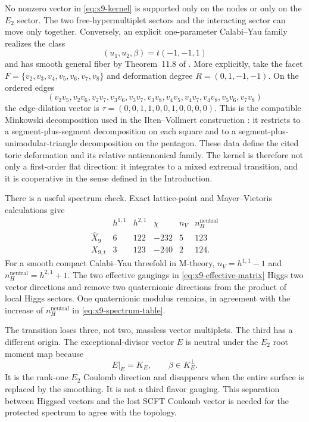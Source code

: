 No nonzero vector in \eqref{eq:x9-kernel} is supported only on the nodes or
only on the $E_2$ sector. The two free-hypermultiplet sectors and the
interacting sector can move only together. Conversely, an explicit
one-parameter Calabi--Yau family realizes the class
\begin{equation}
 (u_1,u_2,\beta)=t(-1,-1,1)
 \label{eq:x9-family-direction}
\end{equation}
and has smooth general fiber by Theorem~11.8 of
\cite{Wuebben:2026smoothing}. More explicitly, take the facet
$F=\{v_2,v_3,v_4,v_5,v_6,v_7,v_8\}$ and deformation degree
$R=(0,1,-1,-1)$. On the ordered edges
\begin{equation}
 (v_2v_5,v_2v_6,v_2v_7,v_3v_6,v_3v_7,v_3v_8,
 v_4v_5,v_4v_7,v_4v_8,v_5v_6,v_7v_8)
 \label{eq:x9-facet-edges}
\end{equation}
the edge-dilation vector is
$\tau=(0,0,1,1,0,0,1,0,0,0,0)$. This is the compatible Minkowski
decomposition used in the Ilten--Vollmert construction
\cite{Altmann:1995,Ilten:2012}: it restricts to a
segment-plus-segment decomposition on each square and to a
segment-plus-unimodular-triangle decomposition on the pentagon. These data
define the cited toric deformation and its relative anticanonical family. The
kernel is
therefore not only a first-order flat direction: it integrates to a mixed
extremal transition, and it is cooperative in the sense defined in the
Introduction.

There is a useful spectrum check. Exact lattice-point and
Mayer--Vietoris calculations give
\begin{equation}
 \begin{array}{c|ccc|cc}
 &h^{1,1}&h^{2,1}&\chi&n_V&n_H^{\mathrm{neutral}}\\
 \hline
 \widehat X_9&6&122&-232&5&123\\
 X_{9,t}&3&123&-240&2&124.
 \end{array}
 \label{eq:x9-spectrum-table}
\end{equation}
For a smooth compact Calabi--Yau threefold in M-theory,
$n_V=h^{1,1}-1$ and $n_H^{\mathrm{neutral}}=h^{2,1}+1$. The two effective
gaugings in \eqref{eq:x9-effective-matrix} Higgs two vector directions and
remove two quaternionic directions from the product of local Higgs sectors.
One quaternionic modulus remains, in agreement with the increase of
$n_H^{\mathrm{neutral}}$ in \eqref{eq:x9-spectrum-table}.

The transition loses three, not two, massless vector multiplets. The third has
a different origin. The exceptional-divisor vector $E$ is neutral under the
$E_2$ root moment map because
\begin{equation}
 E|_E=K_E,
 \qquad
 \beta\in K_E^{\perp}.
 \label{eq:x9-neutral-exceptional}
\end{equation}
It is the rank-one $E_2$ Coulomb direction and disappears when the entire
surface is replaced by the smoothing. It is not a third flavor gauging. This
separation between Higgsed vectors and the lost SCFT Coulomb vector is needed
for the protected spectrum to agree with the topology.

